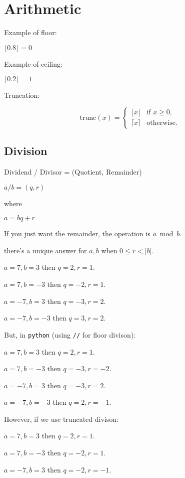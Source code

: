 \chapter{Arithmetic}

Example of floor:

$\lfloor 0.8 \rfloor = 0$

Example of ceiling:

$\lceil 0.2 \rceil = 1$

Truncation:

\begin{equation*}
\mathrm{trunc}(x) = \begin{cases}
\lfloor x \rfloor &\text{if $x \geq 0$,}\\
\lceil x \rceil &\text{otherwise.}
\end{cases}
\end{equation*}

\section{Division}

Dividend / Divisor = (Quotient, Remainder)

$a / b = (q, r)$

where

$a = bq + r$

If you just want the remainder, the operation is $a \bmod b$.

there's a unique answer for $a, b$ when $0 \leq r < |b|$.

$a = 7, b = 3$ then $q = 2, r = 1$.

$a = 7, b = -3$ then $q = -2, r = 1$.

$a = -7, b = 3$ then $q = -3, r = 2$.

$a = -7, b = -3$ then $q = 3, r = 2$.

But, in \texttt{python} (using \texttt{//} for floor divison):

$a = 7, b = 3$ then $q = 2, r = 1$.

$a = 7, b = -3$ then $q = -3, r = -2$.

$a = -7, b = 3$ then $q = -3, r = 2$.

$a = -7, b = -3$ then $q = 2, r = -1$.

However, if we use truncated divison:

$a = 7, b = 3$ then $q = 2, r = 1$.

$a = 7, b = -3$ then $q = -2, r = 1$.

$a = -7, b = 3$ then $q = -2, r = -1$.

